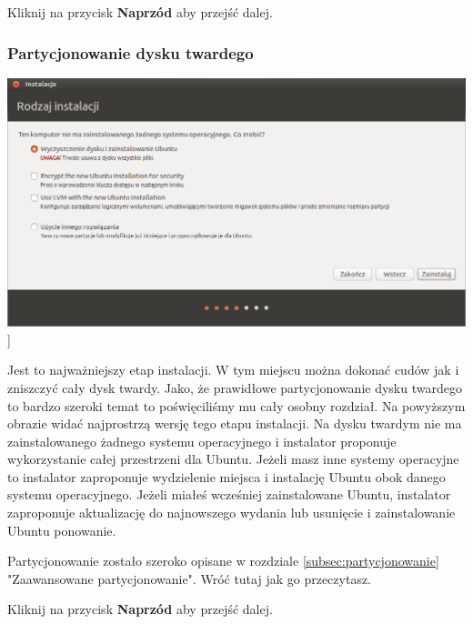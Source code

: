 \begin{flushright}
Kliknij na przycisk \textbf{Naprzód} aby przejść dalej.
\end{flushright}
\clearpage

\subsubsection{Partycjonowanie dysku twardego}
\begin{center}
	\includegraphics[scale=0.5]{images/instalator_partycjonowanie_proste.png}]
\end{center}

Jest to najważniejszy etap instalacji. W tym miejscu można dokonać cudów jak i zniszczyć cały dysk twardy. Jako, że prawidłowe partycjonowanie dysku twardego to bardzo szeroki temat to poświęciliśmy mu cały osobny rozdział. Na powyższym obrazie widać najprostrzą wersję tego etapu instalacji. Na dysku twardym nie ma zainstalowanego żadnego systemu operacyjnego i instalator proponuje wykorzystanie całej przestrzeni dla Ubuntu. Jeżeli masz inne systemy operacyjne to instalator zaproponuje wydzielenie miejsca i instalację Ubuntu obok danego systemu operacyjnego. Jeżeli miałeś wcześniej zainstalowane Ubuntu, instalator zaproponuje aktualizację do najnowszego wydania lub usunięcie i zainstalowanie Ubuntu ponowanie.

Partycjonowanie zostało szeroko opisane w rozdziale \ref{subsec:partycjonowanie} "Zaawansowane partycjonowanie". Wróć tutaj jak go przeczytasz.

\begin{flushright}
Kliknij na przycisk \textbf{Naprzód} aby przejść dalej.
\end{flushright}
\clearpage

